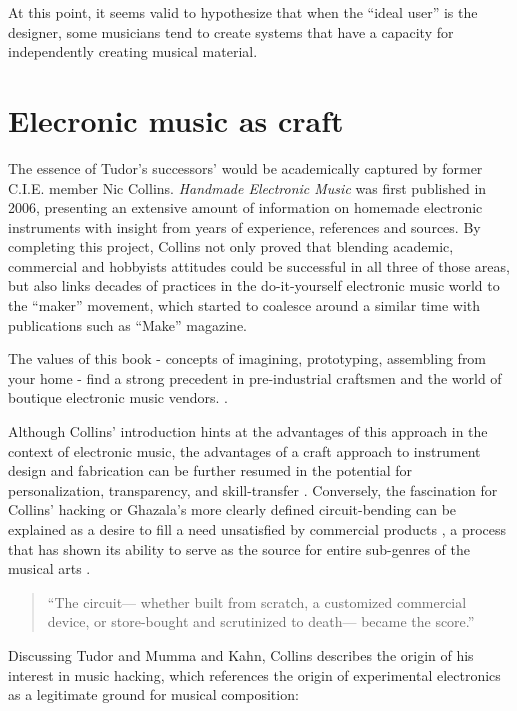 \begin{itemize}
At this point, it seems valid to hypothesize that when the ``ideal user'' is the designer, some musicians tend to create  systems that have a capacity for independently creating musical material. 

\section{Elecronic music as craft} 

	The essence of Tudor’s successors’ would be academically captured by former C.I.E. member Nic Collins. \emph{Handmade Electronic Music} was first published in 2006, presenting an extensive amount of information on homemade electronic instruments with insight from years of experience, references and sources. By completing this project, Collins not only proved that blending academic, commercial and hobbyists attitudes could be successful in all three of those areas, but also links decades of practices in the do-it-yourself electronic music world to the “maker” movement, which started to coalesce around a similar time with publications such as “Make” magazine.

	The values of this book - concepts of imagining, prototyping, assembling from your home - find a strong precedent in pre-industrial craftsmen and the world of boutique electronic music vendors.   \cite{collins2006,ghazala2005,kuivila2004}. 

Although Collins’ introduction hints at the advantages of this approach in the context of electronic music, the advantages of a craft approach to instrument design and fabrication can be further resumed in the potential for personalization, transparency, and skill-transfer \cite{perner2011}. Conversely, the fascination for Collins’ hacking or Ghazala’s more clearly defined circuit-bending can be explained as a desire to fill a need unsatisfied by commercial products \cite{dunne2005}, a process that has shown its ability to serve as the source for entire sub-genres of the musical arts \cite{dunne2005,kelly2009,novak2013}. 
\begin{quote}
“The circuit— whether built from scratch, a customized commercial device, or store-bought and scrutinized to death— became the score.”
\citep{collins2004}
\end{quote}

	Discussing Tudor and Mumma and Kahn, Collins describes the origin of his interest in music hacking, which references the origin of experimental electronics as a legitimate ground for musical composition: 


\end{itemize}
